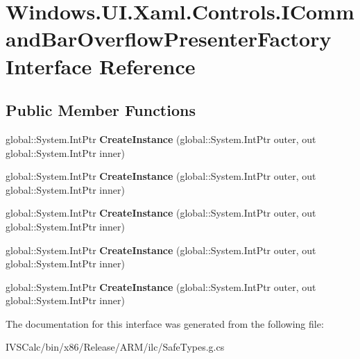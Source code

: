 \hypertarget{interface_windows_1_1_u_i_1_1_xaml_1_1_controls_1_1_i_command_bar_overflow_presenter_factory}{}\section{Windows.\+U\+I.\+Xaml.\+Controls.\+I\+Command\+Bar\+Overflow\+Presenter\+Factory Interface Reference}
\label{interface_windows_1_1_u_i_1_1_xaml_1_1_controls_1_1_i_command_bar_overflow_presenter_factory}
\subsection*{Public Member Functions}
\begin{DoxyCompactItemize}
\item 
\mbox{\label{interface_windows_1_1_u_i_1_1_xaml_1_1_controls_1_1_i_command_bar_overflow_presenter_factory_a26f39f62c27cdf16d8d856dbab80c3b9}} 
global\+::\+System.\+Int\+Ptr {\bfseries Create\+Instance} (global\+::\+System.\+Int\+Ptr outer, out global\+::\+System.\+Int\+Ptr inner)
\item 
\mbox{\label{interface_windows_1_1_u_i_1_1_xaml_1_1_controls_1_1_i_command_bar_overflow_presenter_factory_a26f39f62c27cdf16d8d856dbab80c3b9}} 
global\+::\+System.\+Int\+Ptr {\bfseries Create\+Instance} (global\+::\+System.\+Int\+Ptr outer, out global\+::\+System.\+Int\+Ptr inner)
\item 
\mbox{\label{interface_windows_1_1_u_i_1_1_xaml_1_1_controls_1_1_i_command_bar_overflow_presenter_factory_a26f39f62c27cdf16d8d856dbab80c3b9}} 
global\+::\+System.\+Int\+Ptr {\bfseries Create\+Instance} (global\+::\+System.\+Int\+Ptr outer, out global\+::\+System.\+Int\+Ptr inner)
\item 
\mbox{\label{interface_windows_1_1_u_i_1_1_xaml_1_1_controls_1_1_i_command_bar_overflow_presenter_factory_a26f39f62c27cdf16d8d856dbab80c3b9}} 
global\+::\+System.\+Int\+Ptr {\bfseries Create\+Instance} (global\+::\+System.\+Int\+Ptr outer, out global\+::\+System.\+Int\+Ptr inner)
\item 
\mbox{\label{interface_windows_1_1_u_i_1_1_xaml_1_1_controls_1_1_i_command_bar_overflow_presenter_factory_a26f39f62c27cdf16d8d856dbab80c3b9}} 
global\+::\+System.\+Int\+Ptr {\bfseries Create\+Instance} (global\+::\+System.\+Int\+Ptr outer, out global\+::\+System.\+Int\+Ptr inner)
\end{DoxyCompactItemize}


The documentation for this interface was generated from the following file\+:\begin{DoxyCompactItemize}
\item 
I\+V\+S\+Calc/bin/x86/\+Release/\+A\+R\+M/ilc/Safe\+Types.\+g.\+cs\end{DoxyCompactItemize}
